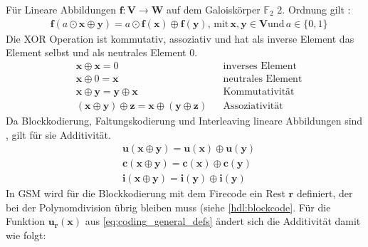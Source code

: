 Für Lineare Abbildungen $\boldsymbol{f}: \boldsymbol{V} \to \boldsymbol{W}$ auf dem Galoiskörper $\mathbb{F}_2$ 2. Ordnung gilt \citep[S. 142 Tabelle 3.2]{werner2008codierung}:
\begin{equation}
\begin{aligned}
& \boldsymbol{f}(a \odot \boldsymbol{x} \oplus \boldsymbol{y}) = a \odot \boldsymbol{f}(\boldsymbol{x}) \oplus \boldsymbol{f}(\boldsymbol{y}), \,\text{mit}\, \boldsymbol{x}, \boldsymbol{y} \in \boldsymbol{V} \text{und}\, a \in \{0, 1\} 
\end{aligned}
\end{equation}\label{eq:lin_func}\noindent
Die \ac{XOR} Operation ist kommutativ, assoziativ und hat als inverse Element das Element selbst und als neutrales Element 0.
\begin{align}
& \boldsymbol{x} \oplus \boldsymbol{x} = 0 & &\text{inverses Element} \label{eq:inverse_element} \\
& \boldsymbol{x} \oplus 0 = \boldsymbol{x} & &\text{neutrales Element} \label{eq:neutral_element} \\
& \boldsymbol{x} \oplus \boldsymbol{y} = \boldsymbol{y} \oplus \boldsymbol{x} & &\text{Kommutativität} \label{eq:komm} \\
& \left( \boldsymbol{x} \oplus \boldsymbol{y} \right) \oplus \boldsymbol{z} = \boldsymbol{x} \oplus \left( \boldsymbol{y} \oplus \boldsymbol{z} \right) & &\text{Assoziativität} \label{eq:asso}
\end{align}\noindent
Da Blockkodierung, Faltungskodierung und Interleaving lineare Abbildungen sind \citep[S. 142 ff.]{werner2008codierung}, gilt für sie Additivität.
\begin{equation}\label{eq:additivity_codes}
\begin{aligned}
& \boldsymbol{u}(\boldsymbol{x} \oplus \boldsymbol{y}) = \boldsymbol{u}(\boldsymbol{x}) \oplus \boldsymbol{u}(\boldsymbol{y}) \\
& \boldsymbol{c}(\boldsymbol{x} \oplus \boldsymbol{y}) = \boldsymbol{c}(\boldsymbol{x}) \oplus \boldsymbol{c}(\boldsymbol{y}) \\
& \boldsymbol{i}(\boldsymbol{x} \oplus \boldsymbol{y}) = \boldsymbol{i}(\boldsymbol{y}) \oplus \boldsymbol{i}(\boldsymbol{y})\end{aligned}
\end{equation}\noindent
In \ac{GSM} wird für die Blockkodierung mit dem Firecode ein Rest $\boldsymbol{r}$ definiert, der bei der Polynomdivision übrig bleiben muss (siehe \autoref{hdl:blockcode}. Für die Funktion $\boldsymbol{u_r}(\boldsymbol{x})$ aus \ref{eq:coding_general_defs} ändert sich die Additivität damit wie folgt:
